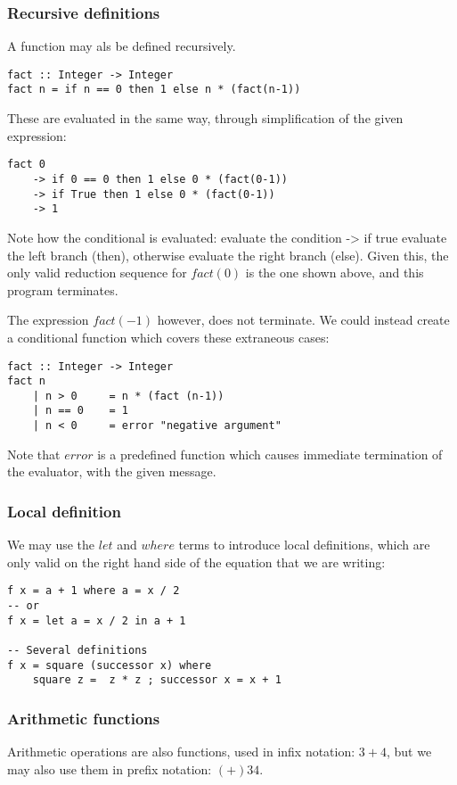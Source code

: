 \subsubsection{Recursive definitions}
A function may als be defined recursively.

\begin{lstlisting}
fact :: Integer -> Integer
fact n = if n == 0 then 1 else n * (fact(n-1))
\end{lstlisting}

These are evaluated in the same way, through simplification of the given
expression:

\begin{lstlisting}
fact 0 
	-> if 0 == 0 then 1 else 0 * (fact(0-1)) 
	-> if True then 1 else 0 * (fact(0-1))
	-> 1
\end{lstlisting}

Note how the conditional is evaluated: evaluate the condition -> if true evaluate the left branch (then), otherwise evaluate the right branch (else).
Given this, the only valid reduction sequence for $fact(0)$ is the one shown above, and this program terminates.

The expression $fact(-1)$ however, does not terminate. We could instead create a conditional function which covers these
extraneous cases:

\begin{lstlisting}
fact :: Integer -> Integer
fact n
	| n > 0		= n * (fact (n-1))
	| n == 0	= 1
	| n < 0		= error "negative argument"
\end{lstlisting}

Note that $error$ is a predefined function which causes immediate termination of the evaluator, with the given message.

\subsubsection{Local definition}
We may use the $let$ and $where$ terms to introduce local definitions, which are only valid on the right hand side of the equation that we 
are writing:

\begin{lstlisting}
f x = a + 1 where a = x / 2
-- or
f x = let a = x / 2 in a + 1

-- Several definitions
f x = square (successor x) where
	square z =  z * z ; successor x = x + 1
\end{lstlisting}

\subsubsection{Arithmetic functions}
Arithmetic operations are also functions, used in infix notation: $3+4$,
but we may also use them in prefix notation: $(+) 3 4$.

